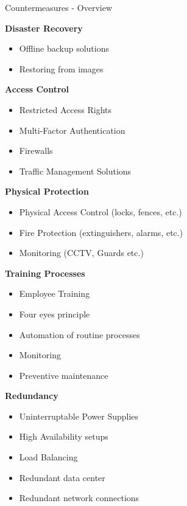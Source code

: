 \begin{theorem}{Countermeasures - Overview}

\textbf{Disaster Recovery}
    \begin{itemize}
        \item Offline backup solutions
        \item Restoring from images
    \end{itemize}

\textbf{Access Control}
    \begin{itemize}
        \item Restricted Access Rights
        \item Multi-Factor Authentication
        \item Firewalls
        \item Traffic Management Solutions
    \end{itemize}

\textbf{Physical Protection}
    \begin{itemize}
        \item Physical Access Control (locks, fences, etc.)
        \item Fire Protection (extinguishers, alarms, etc.)
        \item Monitoring (CCTV, Guards etc.)
    \end{itemize}

\textbf{Training Processes}
    \begin{itemize}
        \item Employee Training
        \item Four eyes principle
        \item Automation of routine processes
        \item Monitoring
        \item Preventive maintenance
    \end{itemize}

\textbf{Redundancy}
    \begin{itemize}
        \item Uninterruptable Power Supplies
        \item High Availability setups
        \item Load Balancing
        \item Redundant data center
        \item Redundant network connections
    \end{itemize}
\end{theorem}


